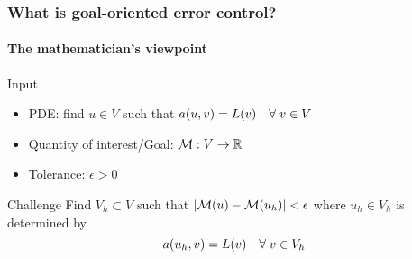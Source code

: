 \begin{frame}[fragile]
  \frametitle{What is goal-oriented error control?}
  \framesubtitle{The mathematician's viewpoint}

  \begin{block}{Input}
  {\small
  \begin{itemize}
  \item PDE: find $u \in V$ such that $a(u, v) = L(v) \quad
    \forall \; v \in V$
  \item Quantity of interest/Goal: $\mathcal{M}: V \rightarrow \mathbb{R}$
  \item Tolerance: $\epsilon > 0$
  \end{itemize}
  }
  \end{block}

  \begin{block}{Challenge}
    Find $V_h \subset V$ such that $|\mathcal{M}(u) - \mathcal{M}(u_h)| <
    \epsilon$ where $u_h \in V_h$ is determined by
    \begin{equation*}
      a(u_h, v) = L(v)  \quad \forall \; v \in V_h
    \end{equation*}
  \end{block}
\end{frame}
